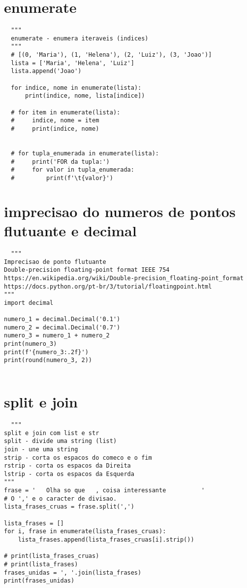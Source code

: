 \documentclass{article}
\begin{document}
\section{enumerate}
\begin{lstlisting}
  """
  enumerate - enumera iteraveis (indices)
  """
  # [(0, 'Maria'), (1, 'Helena'), (2, 'Luiz'), (3, 'Joao')]
  lista = ['Maria', 'Helena', 'Luiz']
  lista.append('Joao')
  
  for indice, nome in enumerate(lista):
      print(indice, nome, lista[indice])
  
  # for item in enumerate(lista):
  #     indice, nome = item
  #     print(indice, nome)
  
  
  # for tupla_enumerada in enumerate(lista):
  #     print('FOR da tupla:')
  #     for valor in tupla_enumerada:
  #         print(f'\t{valor}')
\end{lstlisting}
\section{imprecisao do numeros de pontos flutuante e decimal}
\begin{lstlisting}
  """
Imprecisao de ponto flutuante
Double-precision floating-point format IEEE 754
https://en.wikipedia.org/wiki/Double-precision_floating-point_format
https://docs.python.org/pt-br/3/tutorial/floatingpoint.html
"""
import decimal

numero_1 = decimal.Decimal('0.1')
numero_2 = decimal.Decimal('0.7')
numero_3 = numero_1 + numero_2
print(numero_3)
print(f'{numero_3:.2f}')
print(round(numero_3, 2))
  
\end{lstlisting}
\section{split e join}
\begin{lstlisting}
  """
split e join com list e str
split - divide uma string (list)
join - une uma string
strip - corta os espacos do comeco e o fim
rstrip - corta os espacos da Direita
lstrip - corta os espacos da Esquerda
"""
frase = '   Olha so que   , coisa interessante          '
# O ',' e o caracter de divisao.
lista_frases_cruas = frase.split(',')

lista_frases = []
for i, frase in enumerate(lista_frases_cruas):
    lista_frases.append(lista_frases_cruas[i].strip())

# print(lista_frases_cruas)
# print(lista_frases)
frases_unidas = ', '.join(lista_frases)
print(frases_unidas)
\end{lstlisting}
\end{document}
